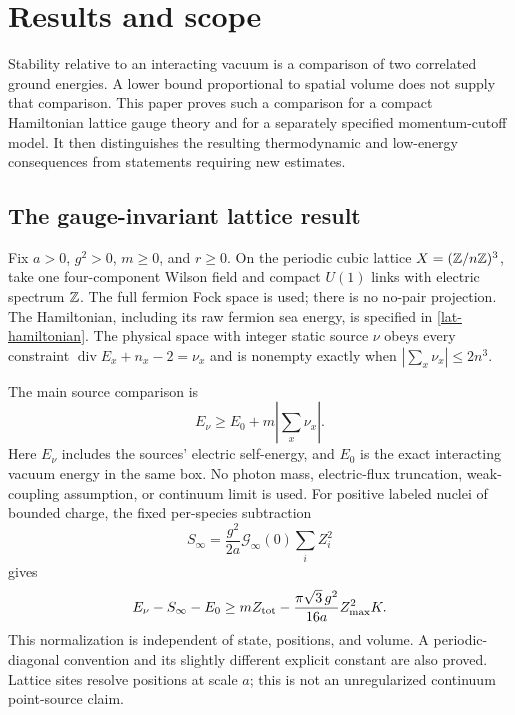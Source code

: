 \section{Results and scope}
\label{intro4-section}

Stability relative to an interacting vacuum is a comparison of two
correlated ground energies. A lower bound proportional to spatial
volume does not supply that comparison. This paper proves such a
comparison for a compact Hamiltonian lattice gauge theory and for a
separately specified momentum-cutoff model. It then distinguishes
the resulting thermodynamic and low-energy consequences from
statements requiring new estimates.

\subsection{The gauge-invariant lattice result}

Fix $a>0$, $g^2>0$, $m\ge0$, and $r\ge0$. On the periodic cubic
lattice $X=(\mathbb Z/n\mathbb Z)^3$, take one four-component Wilson field and
compact $U(1)$ links with electric spectrum $\mathbb Z$. The full fermion
Fock space is used; there is no no-pair projection. The Hamiltonian,
including its raw fermion sea energy, is specified in
\eqref{lat-hamiltonian}. The physical space with integer static
source $\nu$ obeys every constraint
$\operatorname{div}E_x+n_x-2=\nu_x$ and is nonempty exactly when
$|\sum_x\nu_x|\le2n^3$.

The main source comparison is
\begin{equation}
 E_\nu\ge E_0+m\left|\sum_x\nu_x\right|.
 \label{intro4-main}
\end{equation}
Here $E_\nu$ includes the sources' electric self-energy, and $E_0$
is the exact interacting vacuum energy in the same box. No photon
mass, electric-flux truncation, weak-coupling assumption, or continuum
limit is used. For positive labeled nuclei of bounded charge,
the fixed per-species subtraction
\[
 S_\infty=\frac{g^2}{2a}\mathcal G_\infty(0)\sum_iZ_i^2
\]
gives
\begin{equation}
 E_\nu-S_\infty-E_0
 \ge mZ_{\rm tot}-\frac{\pi\sqrt3\,g^2}{16a}Z_{\max}^2K .
 \label{intro4-subtracted}
\end{equation}
This normalization is independent of state, positions, and volume.
A periodic-diagonal convention and its slightly different explicit
constant are also proved. Lattice sites resolve positions at scale
$a$; this is not an unregularized continuum point-source claim.

